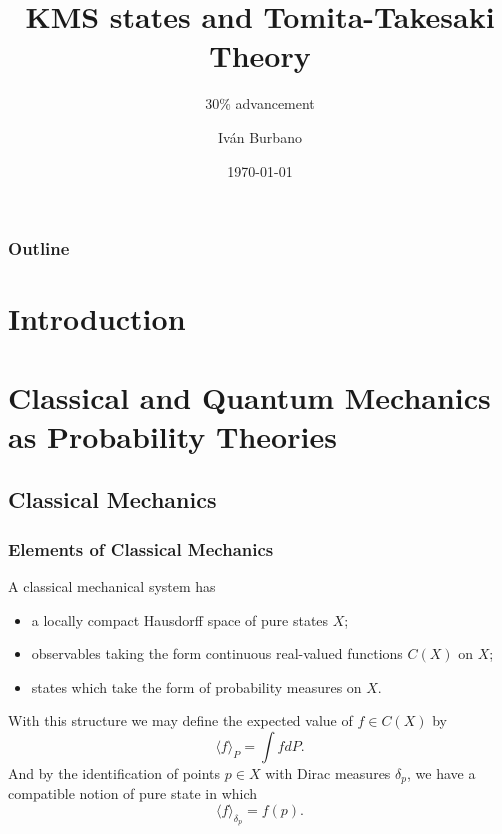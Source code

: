 \documentclass{beamer}
\title{KMS states and Tomita-Takesaki Theory}
\subtitle{30\% advancement}
\author{Iván Burbano}
\institute{Universidad de los Andes}
\date{\today}
\theoremstyle{definition}
\begin{document}
\begin{frame}
\titlepage
\end{frame}

\begin{frame}
\frametitle{Outline}
\tableofcontents
\end{frame}

\section{Introduction}

\section{Classical and Quantum Mechanics as Probability Theories}

\subsection{Classical Mechanics}

\begin{frame}
\frametitle{Elements of Classical Mechanics}
A classical mechanical system has
\begin{itemize}
\item a locally compact Hausdorff space of pure states $X$;
\item observables taking the form continuous real-valued functions $C(X)$ on $X$;
\item states which take the form of probability measures on $X$.
\end{itemize}
With this structure we may define the expected value of $f\in C(X)$ by 
\begin{equation}
\langle f \rangle _P = \int f dP.
\end{equation}
And by the identification of points $p\in X$ with Dirac measures $\delta_p$, we have a compatible notion of pure state in which  
\begin{equation}
\langle f \rangle _{\delta_p}=f(p).
\end{equation}
\end{frame}
\end{document}
